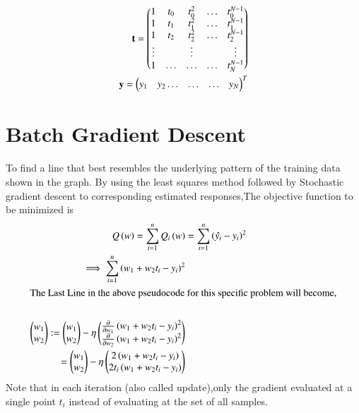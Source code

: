 \documentclass[journal,12pt,twocolumn]{IEEEtran}
\begin{document}
\begin{align}
\mathbf{t}= \begin{pmatrix} 1 & t_{0} & t_{0}^2 & \ldots & t_{0}^{N-1} \\
		1 & t_{1} & t_{1}^2 & \ldots & t_{1}^{N-1} \\
		1 & t_{2} & t_{2}^2 & \ldots & t_{2}^{N-1} \\
		\vdots & & \vdots &  & \vdots  \\
		    1 & \ldots & \ldots & \ldots & t_{N}^{N-1} \end{pmatrix}\label{eq:1}\\
\mathbf{y} =\begin{pmatrix}y_1 & y_2 \ldots & \ldots & \ldots & y_N\end{pmatrix}^T
\end{align}
\section{Batch Gradient Descent}
To find a line that best resembles the underlying pattern of the training data shown in the graph. By using the least squares method followed by Stochastic gradient descent to corresponding estimated responses,The objective function to be minimized is
\begin{align}
Q\left({w}\right) = \sum_{i=1}^{n} Q_{i}\left(w\right)
&=\sum_{i=1}^{n}\left(\hat{y_{i}}-y_{i}\right)^2\\
\implies \sum_{i=1}^{n}\left(w_{1}+w_{2}t_{i}-y_{i}\right)^2\\
\intertext{The Last Line in the above pseudocode for this specific problem will become,}\\
\begin{pmatrix}w_{1} \\ w_{2}\end{pmatrix}:= \begin{pmatrix}w_{1} \\ w_{2}\end{pmatrix} -\eta \begin{pmatrix} \frac{\partial}{\partial w_{1}}\left(w_{1} + w_{2}t_{i} - y_{i}\right)^2\\ \frac{\partial}{\partial w_{2}}\left(w_{1} + w_{2}t_{i} - y_{i}\right)^2\end{pmatrix}\\
= \begin{pmatrix}w_{1}\\ w_{2}\end{pmatrix}-\eta \begin{pmatrix}2\left(w_{1}+w_{2}t_{i}-y_{i}\right)\\ 2t_{i}\left(w_{1}+w_{2}t_{i}-y_{i}\right)\end{pmatrix}
\end{align}
Note that in each iteration (also called update),only the gradient evaluated at a single point ${\displaystyle t_{i}}$ instead of evaluating at the set of all samples.\\
\end{document}

